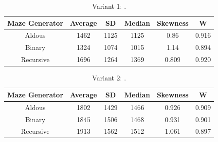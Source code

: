 \begin{table}[!ht]
    \centering
    \caption{Variant 1: .} 
    \begin{tabular}{c c c c c c}
    \hline
        Maze Generator & Average & SD & Median & Skewness & W \\ \hline
        Aldous & 1462 & 1125 & 1125 & 0.86 & 0.916  \\ 
        Binary & 1324 & 1074 & 1015 & 1.14 & 0.894  \\ 
        Recursive & 1696 & 1264 & 1369 & 0.809 & 0.920 \\ \hline
    \end{tabular}
\end{table}

\begin{table}[!ht]
    \centering
    \caption{Variant 2: .} 
    \begin{tabular}{cccccc}
    \hline
        Maze Generator & Average & SD & Median & Skewness & W  \\ \hline
        Aldous & 1802 & 1429 & 1466 & 0.926 & 0.909 \\ 
        Binary & 1845 & 1506 & 1468 & 0.931 & 0.901\\ 
        Recursive & 1913 & 1562 & 1512 & 1.061 & 0.897\\ \hline
    \end{tabular}
\end{table}

